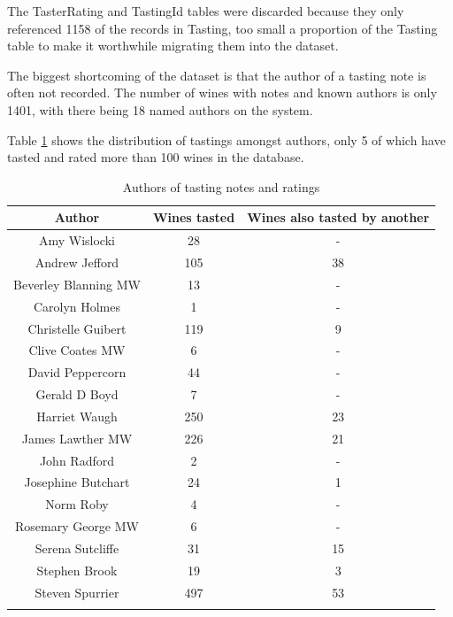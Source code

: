 The TasterRating and TastingId tables were discarded because they only referenced 1158 of the records in Tasting, too small a proportion of the Tasting table to make it worthwhile migrating them into the dataset.


The biggest shortcoming of the dataset is that the author of a tasting note is often not recorded. The number of wines with notes and known authors is only 1401, with there being 18 named authors on the system. 

Table \ref{table:authors} shows the distribution of tastings amongst authors, only 5 of which have tasted and rated more than 100 wines in the database.

\begin{table}[ht]
    \caption{Authors of tasting notes and ratings}
    \centering
    \begin{tabular}{c c c}
        \\\hline\hline
        Author               & Wines tasted & Wines also tasted by another
        \\\hline
        Amy Wislocki         &           28 & - \\
        Andrew Jefford       &          105 & 38 \\
        Beverley Blanning MW &           13 & - \\
        Carolyn Holmes       &            1 & - \\
        Christelle Guibert   &          119 & 9 \\
        Clive Coates MW      &            6 & - \\
        David Peppercorn     &           44 & - \\
        Gerald D Boyd        &            7 & - \\
        Harriet Waugh        &          250 & 23 \\
        James Lawther MW     &          226 & 21 \\
        John Radford         &            2 & - \\
        Josephine Butchart   &           24 & 1 \\
        Norm Roby            &            4 & - \\
        Rosemary George MW   &            6 & - \\
        Serena Sutcliffe     &           31 & 15 \\
        Stephen Brook        &           19 & 3 \\
        Steven Spurrier      &          497 & 53 \\
        \\\hline
    \end{tabular}
    \label{table:authors}
\end{table}

